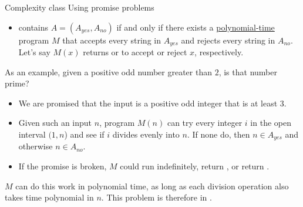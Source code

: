 \begin{frame}{Complexity class }{Using promise problems}

\begin{itemize}
    \item[\CompClass{P}] contains $A=(A_{yes},A_{no})$ if and only if there exists a \href{https://en.wikipedia.org/wiki/Time_complexity\#Polynomial_time}{polynomial-time} program $M$ that accepts every string in $A_{yes}$ and rejects every string in $A_{no}$.  Let's say $M(x)$ returns \True{} or \False{} to accept or reject $x$, respectively.
\end{itemize}
As an example, given a positive odd number greater than $2$, is that number prime?
\begin{itemize}
    \item We are promised that the input is a positive odd integer that is at least $3$.
    \item Given such an input $n$,\textbf{} program $M(n)$ can try every integer $i$ in the open interval $(1,n$) and see if $i$ divides evenly into $n$.  If none do, then
    $n\in A_{yes}$ and otherwise $n\in A_{no}$.
    \item If the promise is broken, $M$ could run indefinitely, return \True{}, or return \False{}.
\end{itemize}
$M$ can do this work in polynomial time, as long as each division operation also takes time polynomial in $n$.
This problem is therefore in .
\end{frame}
